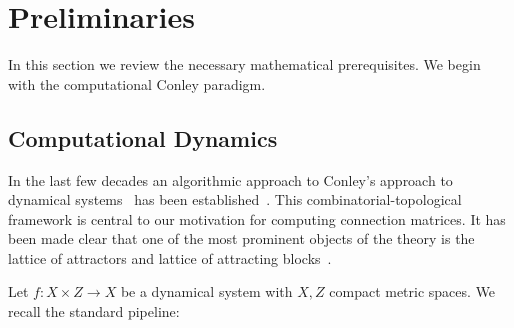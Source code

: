 

\section{Preliminaries}\label{sec:prelims}


In this section we review the necessary mathematical prerequisites.  We begin with the computational Conley paradigm.



\subsection{Computational Dynamics}

In the last few decades an algorithmic approach to Conley's approach to dynamical systems~\cite{conley} has been established~\cite{kmv, cmdb, cmdbchaos}.  This combinatorial-topological framework is central to our motivation for computing connection matrices.    It has been made clear that one of the most prominent objects of the theory is the lattice of attractors and lattice of attracting blocks~\cite{kmv,lsa,lsa2,salamon}.

Let $f:X\times Z\to X$ be a dynamical system with $X,Z$ compact metric spaces.  We recall the standard pipeline:
%

